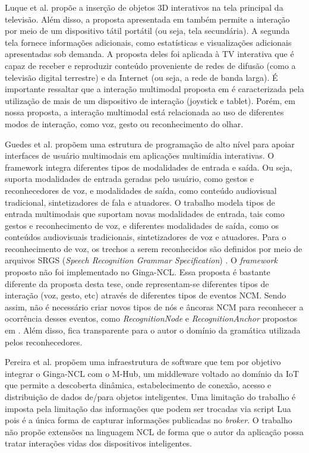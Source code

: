 Luque et al.\cite{luque2014integration} propõe a inserção de objetos 3D interativos na tela principal da televisão. Além disso, a proposta apresentada em \cite{luque2014integration} também permite a interação por meio de um dispositivo tátil portátil (ou seja, tela secundária). A segunda tela fornece informações adicionais, como estatísticas e visualizações adicionais apresentadas sob demanda. A proposta deles foi aplicada à TV interativa que é capaz de receber e reproduzir conteúdo proveniente de redes de difusão (como a televisão digital terrestre) e da Internet (ou seja, a rede de banda larga). É importante ressaltar que a interação multimodal proposta em \cite{luque2014integration} é caracterizada pela utilização de mais de um dispositivo de interação (joystick e tablet). Porém, em nossa proposta, a interação multimodal está relacionada ao uso de diferentes modos de interação, como voz, gesto ou reconhecimento do olhar.



Guedes et al. \cite{guedes2016extending} propõem uma estrutura de programação de alto nível para apoiar interfaces de usuário multimodais em aplicações multimídia interativas. O framework integra diferentes tipos de modalidades de entrada e saída. Ou seja, suporta modalidades de entrada geradas pelo usuário, como gestos e reconhecedores de voz, e modalidades de saída, como conteúdo audiovisual tradicional, sintetizadores de fala e atuadores. O trabalho modela tipos de entrada multimodais que suportam novas modalidades de entrada, tais como gestos e reconhecimento de voz, e diferentes modalidades de saída, como os conteúdos audiovisuais tradicionais, sintetizadores de voz e atuadores. Para o reconhecimento de voz, os trechos a serem reconhecidos são definidos por meio de arquivos SRGS (\emph{Speech Recognition Grammar Specification}) \cite{srgs}. O \textit{framework} proposto não foi implementado no Ginga-NCL. Essa proposta é bastante diferente da proposta desta tese, onde representam-se diferentes tipos de interação (voz, gesto, etc) através de  diferentes tipos de eventos NCM. Sendo assim, não é necessário criar novos tipos de nós e âncoras NCM para reconhecer a ocorrência desses eventos, como \textit{RecognitionNode} e \textit{RecognitionAnchor} propostos em  \cite{guedes2016extending}. Além disso, fica transparente para o autor o domínio da gramática utilizada pelos reconhecedores.

Pereira et al. \cite{pereira2017middleware} propõem uma infraestrutura de software que tem por objetivo integrar o Ginga-NCL\cite{ABNT:2011aa} com o M-Hub\cite{talavera2015mobile}, um middleware voltado ao domínio da IoT que permite a descoberta dinâmica, estabelecimento de conexão, acesso e distribuição de dados de/para objetos inteligentes. Uma limitação do trabalho é imposta pela limitação das informações que podem ser trocadas via script Lua pois é a única forma de capturar informações publicadas no \textit{broker}. O trabalho não propõe extensões na linguagem NCL de forma que o autor da aplicação possa tratar interações vidas dos dispositivos inteligentes.

